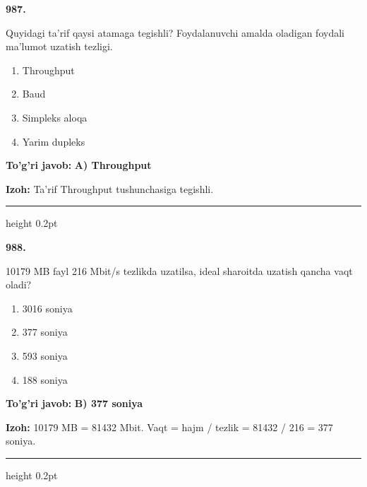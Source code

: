 \documentclass[10pt,a4paper,oneside]{article}
\begin{document}
\noindent\textbf{\color{ink}987.}
\par
Quyidagi ta'rif qaysi atamaga tegishli? Foydalanuvchi amalda oladigan foydali ma'lumot uzatish tezligi.
\begin{enumerate}[label=\Alph*),leftmargin=9mm]
\item Throughput
\item Baud
\item Simpleks aloqa
\item Yarim dupleks
\end{enumerate}
\begin{tcolorbox}[enhanced,breakable,colback=teal!4,colframe=teal!50!black,boxrule=0.5pt,arc=1.1mm,left=3mm,right=3mm,top=1.7mm,bottom=1.7mm,before skip=2mm,after skip=2mm]
\textbf{\color{teal}To'g'ri javob:} \textbf{A) Throughput}
\par\smallskip
\textbf{Izoh:} Ta'rif Throughput tushunchasiga tegishli.
\end{tcolorbox}
\vspace{2mm}\hrule height 0.2pt \vspace{3mm}

\noindent\textbf{\color{ink}988.}
\par
10179 MB fayl 216 Mbit/s tezlikda uzatilsa, ideal sharoitda uzatish qancha vaqt oladi?
\begin{enumerate}[label=\Alph*),leftmargin=9mm]
\item 3016 soniya
\item 377 soniya
\item 593 soniya
\item 188 soniya
\end{enumerate}
\begin{tcolorbox}[enhanced,breakable,colback=teal!4,colframe=teal!50!black,boxrule=0.5pt,arc=1.1mm,left=3mm,right=3mm,top=1.7mm,bottom=1.7mm,before skip=2mm,after skip=2mm]
\textbf{\color{teal}To'g'ri javob:} \textbf{B) 377 soniya}
\par\smallskip
\textbf{Izoh:} 10179 MB = 81432 Mbit. Vaqt = hajm / tezlik = 81432 / 216 = 377 soniya.
\end{tcolorbox}
\vspace{2mm}\hrule height 0.2pt \vspace{3mm}
\end{document}
